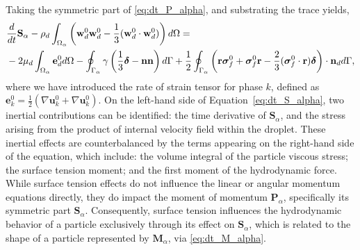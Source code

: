 Taking the symmetric part of \ref{eq:dt_P_alpha}, and substrating the trace yields, 
\begin{align}
    &\ddt {\textbf{S}_\alpha}
    - \rho_d\intO{\left(\textbf{w}_d^0 \textbf{w}_d^0 -\frac{1}{3} (\textbf{w}_d^0 \cdot  \textbf{w}_d^0)\right)}
    = \nonumber \\
    &- 2\mu_d\intO{\textbf{e}_d^0}
    -  \intS{ \gamma
        \left( \frac{1}{3}\bm\delta - \textbf{nn} \right)
    }
    + \frac{1}{2}\intS{\left(\textbf{r}\bm\sigma_f^0+\bm\sigma_f^0\textbf{r}-\frac{2}{3}(\bm\sigma_f^0 \cdot \textbf{r})\bm\delta \right)\cdot \textbf{n}_d},
    \label{eq:dt_S_alpha}
\end{align}
where we have introduced the rate of strain tensor for phase \( k \), defined as \( \mathbf{e}_k^0 = \frac{1}{2} (\nabla \mathbf{u}_k^0 + \nabla \mathbf{u}_k^0) \). 
On the left-hand side of Equation~\ref{eq:dt_S_alpha}, two inertial contributions can be identified: the time derivative of $\mathbf{S}_\alpha$, and the stress arising from the product of internal velocity field within the droplet. 
These inertial effects are counterbalanced by the terms appearing on the right-hand side of the equation, which include: the volume integral of the particle viscous stress; the surface tension moment; and the first moment of the hydrodynamic force.
While surface tension effects do not influence the linear or angular momentum equations directly, they do impact the moment of momentum $\textbf{P}_\alpha$, specifically its symmetric part $\textbf{S}_\alpha$.
Consequently, surface tension influences the hydrodynamic behavior of a particle exclusively through its effect on $\textbf{S}_\alpha$, which is related to the shape of a particle represented by $\textbf{M}_\alpha$, via \ref{eq:dt_M_alpha}.
